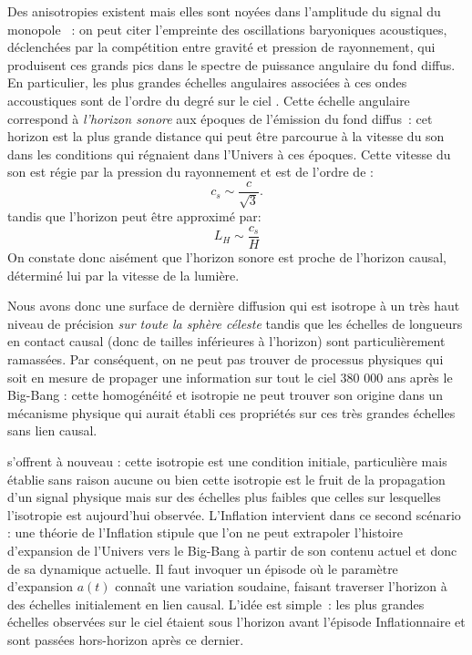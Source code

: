 Des anisotropies existent mais elles sont noyées dans l'amplitude du signal du monopole~ : on peut citer l'empreinte des oscillations baryoniques acoustiques, déclenchées par la compétition entre gravité et pression de rayonnement, qui produisent ces grands pics dans le spectre de puissance angulaire du fond diffus. En particulier, les plus grandes échelles angulaires associées à ces ondes accoustiques  sont de l'ordre du degré sur le ciel . Cette échelle angulaire correspond à \textit{l'horizon sonore} aux époques de l'émission du fond diffus~: cet horizon est la plus grande distance qui peut être parcourue à la vitesse du son dans les conditions qui régnaient dans l'Univers à ces époques. Cette vitesse du son est régie par la pression du rayonnement et est de l'ordre de :
\begin{equation}
c_s\sim \frac{c}{\sqrt 3}.
\end{equation}
tandis que l'horizon peut être approximé par:
\begin{equation}
L_H\sim\frac{c_s}{H}
\end{equation}
On constate donc aisément que l'horizon sonore est proche de l'horizon causal, déterminé lui par la vitesse de la lumière.

Nous avons donc une surface de dernière diffusion qui est isotrope à un très haut niveau de précision \textit{sur toute la sphère céleste} tandis que les échelles de longueurs en contact causal (donc de tailles inférieures à l'horizon) sont particulièrement ramassées. Par conséquent, on ne peut pas trouver de processus physiques qui soit en mesure de propager une information sur tout le ciel 380 000 ans après le Big-Bang : cette homogénéité et isotropie ne peut trouver son origine dans un mécanisme physique qui aurait établi ces propriétés sur ces très grandes échelles sans lien causal.

 s'offrent à nouveau : cette isotropie est une condition initiale, particulière mais établie sans raison aucune ou bien cette isotropie est le fruit de la propagation d'un signal physique mais sur des échelles plus faibles que celles sur lesquelles l'isotropie est aujourd'hui observée. L'Inflation intervient dans ce second scénario : une théorie de l'Inflation stipule que l'on ne peut extrapoler l'histoire d'expansion de l'Univers vers le Big-Bang à partir de son contenu actuel et donc de sa dynamique actuelle. Il faut invoquer un épisode où le paramètre d'expansion $a(t)$ connaît une variation soudaine, faisant traverser l'horizon à des échelles initialement en lien causal. L'idée est simple~: les plus grandes échelles observées sur le ciel étaient sous l'horizon avant l'épisode Inflationnaire et sont passées hors-horizon après ce dernier. 

